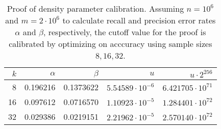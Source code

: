 \begin{table}[!ht]
 \centering
  \begin{tabular}{rrrrr}
  \toprule
  $k$ & $\alpha$ & $\beta$ & $u$ & $u \cdot 2^{256}$ \\
  \midrule
  8 & 0.196216 & 0.1373622 & $5.54589\cdot 10^{-6}$ & $6.421705\cdot 10^{71}$\\
  16 & 0.097612 & 0.0716570 & $1.10923\cdot 10^{-5}$ & $1.284401\cdot 10^{72}$\\
  32 & 0.029386 & 0.0219151 & $2.21962\cdot 10^{-5}$ & $2.570140\cdot 10^{72}$\\
  \bottomrule
  \end{tabular}
   \caption[Proof of density parameter calibration]{Proof of density parameter calibration. Assuming $n = 10^6$ and $m=2\cdot 10^6$ to calculate recall and precision error rates $\alpha$ and $\beta$, respectively, the cutoff value for the proof is calibrated by optimizing on acccuracy using sample sizes $8, 16, 32$.}
  \label{tab:estim}
\end{table}

